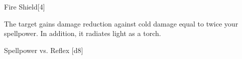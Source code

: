 \begin{spellsection}{Fire Shield}[4]
    \begin{spellheader}
    \end{spellheader}
    \begin{spellcontent}
        \begin{spelltargetinginfo}
        \end{spelltargetinginfo}
        \begin{spelleffects}
            \spelleffect The target gains damage reduction against cold damage equal to twice your spellpower. In addition, it radiates light as a torch.
            \spelldur \durshort \dismissable
        \end{spelleffects}
    \end{spellcontent}
    \begin{spellsubcontent}
        \begin{spelltargetinginfo}
        \end{spelltargetinginfo}
        \begin{spelleffects}
            \begin{spellattack}{Spellpower vs. Reflex}
                \spellsuccess {}[d8]
            \end{spellattack}
        \end{spelleffects}
    \end{spellsubcontent}
    \begin{spellfooter}
        \miscastexplode
    \end{spellfooter}
\end{spellsection}

